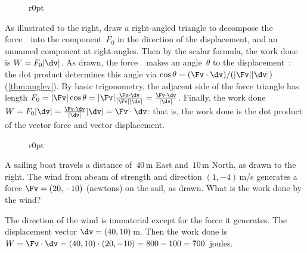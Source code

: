 \begin{wrapfigure}[4]r{0pt}\end{wrapfigure}
As illustrated to the right, draw a right-angled triangle to decompose the force~\Fv\ into the component~\(F_0\) in the direction of the displacement, and an unnamed component at right-angles.
Then by the scalar formula, the work done is \(W=F_0|\dv|\).
As drawn, the force~\Fv\ makes an angle~\(\theta\) to the displacement~\dv: the dot product determines this angle via \(\cos\theta=(\Fv\cdot\dv)/(|\Fv||\dv|)\)  (\cref{thm:anglev}).
By basic trigonometry, the adjacent side of the force triangle has length \(F_0=|\Fv|\cos\theta=|\Fv|\frac{\Fv\cdot\dv}{|\Fv||\dv|}=\frac{\Fv\cdot\dv}{|\dv|}\).
Finally, the work done \(W=F_0|\dv|=\frac{\Fv\cdot\dv}{|\dv|}|\dv|=\Fv\cdot\dv\): that is, the work done is the dot product of the vector force and vector displacement.
\par
\endgroup

\begin{reduce}
\begin{wrapfigure}[6]r{0pt}
\end{wrapfigure}
\begin{example} 
A sailing boat travels a distance of~\(40\)\,m East and~\(10\)\,m North, as drawn to the right.
The wind from abeam of strength and direction \((1,-4)\)\,m/s generates a force \(\Fv=(20,-10)\) (newtons) on the sail, as drawn.
What is the work done by the wind?

\begin{solution} 
The direction of the wind is immaterial except for the force it generates.
The displacement vector \(\dv=(40,10)\)\,m.
Then the work done is \(W=\Fv\cdot\dv =(40,10)\cdot(20,-10) =800-100 =700\)~joules. 
\end{solution}
\end{example}
\end{reduce}



